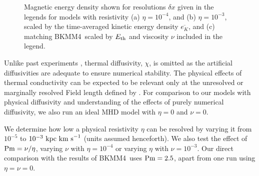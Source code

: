 \documentclass[preprint2]{aastex63}
\newcommand\Pm{{\rm Pm} }
\newcommand\SNr{\dot\sigma_{\rm sn}}
\newcommand\EST{E_{\rm th}}
\newcommand\kpc{~ {\rm kpc}}
\newcommand\dx{ {\delta x}}
\newcommand\kms{~ {\rm km~ s}^{-1}}
\newcommand\BKM{{\sf BKMM4}}
\newcommand{\fg}[1]{\textcolor{midgreen}{#1}}
\newcommand{\mm}[1]{\textcolor{mypurple}{#1}}
\begin{document}
\begin{figure}
\caption{
 Magnetic energy density \fg{shown for resolutions $\dx$ %
   given in the legends for models with resistivity (a)
   $\eta=10^{-4}$, and (b) $\eta=10^{-3}$, scaled by the} 
 time-averaged kinetic energy density $\overline{e_K}$,
 \fg{and (c) matching \BKM\, scaled by $\EST$ %
   \fg{and viscosity $\nu$ 
    included in the legend.} }
\label{fig:eb-res}}
\end{figure}

 \fg{Unlike past} experiments \citep{Gent:2013b,Gent:2013a,GMKSH20},
 thermal diffusivity, $\chi$, \fg{is omitted as} the artificial diffusivities
 are adequate to ensure numerical stability.
 \fg{The} physical effects of thermal conductivity can be expected to be
 relevant only at the unresolved or marginally resolved Field length defined
 by \citet[][named after George Field, not the magnetic field]{BM90}.
 \fg{For comparison to our models with physical diffusivity and understanding
 of the effects of purely numerical diffusivity, we also run an ideal MHD model
 with} $\eta=0$ \fg{and $\nu=0$.}

 We determine how low a physical resistivity $\eta$ can be resolved by varying
 it from $10^{-5}$ to $10^{-3}\kpc\kms$ (units assumed henceforth).
 \fg{We also test the effect of $\Pm=\nu/\eta$, varying $\nu$ with 
 $\eta=10^{-4}$ or varying $\eta$ with $\nu=10^{-3}$.}
 \fg{Our direct comparison with the results of \BKM\ uses $\Pm=2.5$, apart
 from one run using $\eta=\nu=0$.}
 
\end{document}
